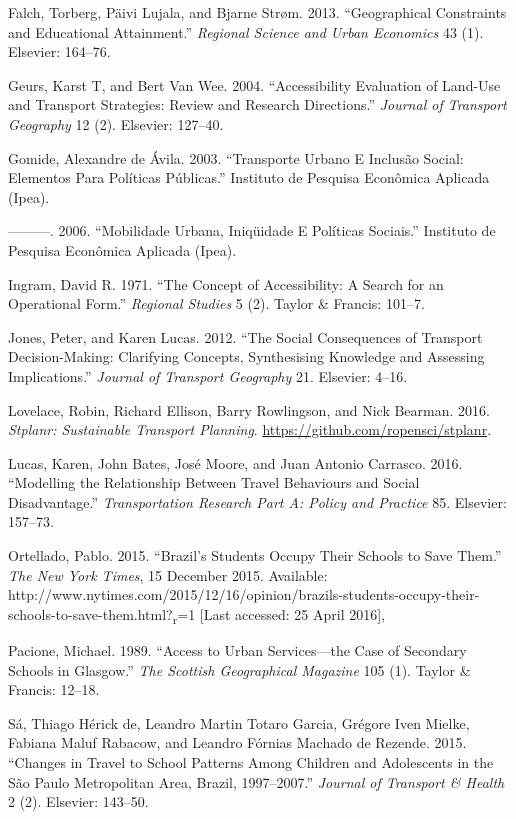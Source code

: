 \documentclass[3p,authoryear,preprint,review,12pt]{elsarticle}
\begin{document}
Falch, Torberg, P{ä}ivi Lujala, and Bjarne Str{ø}m. 2013. ``Geographical
Constraints and Educational Attainment.'' \emph{Regional Science and
Urban Economics} 43 (1). Elsevier: 164--76.

Geurs, Karst T, and Bert Van Wee. 2004. ``Accessibility Evaluation of
Land-Use and Transport Strategies: Review and Research Directions.''
\emph{Journal of Transport Geography} 12 (2). Elsevier: 127--40.

Gomide, Alexandre de {Á}vila. 2003. ``Transporte Urbano E Inclusão
Social: Elementos Para Políticas Públicas.'' Instituto de Pesquisa
Econômica Aplicada (Ipea).

---------. 2006. ``Mobilidade Urbana, Iniqüidade E Políticas Sociais.''
Instituto de Pesquisa Econômica Aplicada (Ipea).

Ingram, David R. 1971. ``The Concept of Accessibility: A Search for an
Operational Form.'' \emph{Regional Studies} 5 (2). Taylor \& Francis:
101--7.

Jones, Peter, and Karen Lucas. 2012. ``The Social Consequences of
Transport Decision-Making: Clarifying Concepts, Synthesising Knowledge
and Assessing Implications.'' \emph{Journal of Transport Geography} 21.
Elsevier: 4--16.

Lovelace, Robin, Richard Ellison, Barry Rowlingson, and Nick Bearman.
2016. \emph{Stplanr: Sustainable Transport Planning}.
\url{https://github.com/ropensci/stplanr}.

Lucas, Karen, John Bates, Jos{é} Moore, and Juan Antonio Carrasco. 2016.
``Modelling the Relationship Between Travel Behaviours and Social
Disadvantage.'' \emph{Transportation Research Part A: Policy and
Practice} 85. Elsevier: 157--73.

Ortellado, Pablo. 2015. ``Brazil's Students Occupy Their Schools to Save
Them.'' \emph{The New York Times}, 15 December 2015. Available:
http://www.nytimes.com/2015/12/16/opinion/brazils-students-occupy-their-schools-to-save-them.html?\textsubscript{r}=1
{[}Last accessed: 25 April 2016{]},

Pacione, Michael. 1989. ``Access to Urban Services---the Case of
Secondary Schools in Glasgow.'' \emph{The Scottish Geographical
Magazine} 105 (1). Taylor \& Francis: 12--18.

S{á}, Thiago H{é}rick de, Leandro Martin Totaro Garcia, Gr{é}gore Iven
Mielke, Fabiana Maluf Rabacow, and Leandro F{ó}rnias Machado de Rezende.
2015. ``Changes in Travel to School Patterns Among Children and
Adolescents in the São Paulo Metropolitan Area, Brazil, 1997--2007.''
\emph{Journal of Transport \& Health} 2 (2). Elsevier: 143--50.
\end{document}
